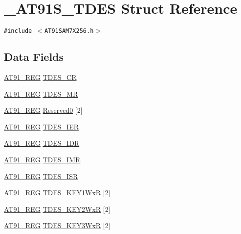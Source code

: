 \hypertarget{struct__AT91S__TDES}{
\section{\_\-AT91S\_\-TDES Struct Reference}
\label{struct__AT91S__TDES}
}
{\tt \#include $<$AT91SAM7X256.h$>$}

\subsection*{Data Fields}
\begin{CompactItemize}
\item 
\hyperlink{AT91SAM7X256_8h_712ad5a1ac1bd02f3e95a7526c283ce1}{AT91\_\-REG} \hyperlink{struct__AT91S__TDES_7b48f8c1a3bf999c41c0081813b4a75b}{TDES\_\-CR}
\item 
\hyperlink{AT91SAM7X256_8h_712ad5a1ac1bd02f3e95a7526c283ce1}{AT91\_\-REG} \hyperlink{struct__AT91S__TDES_8962dd4d8dd09c236b10c035683fe22f}{TDES\_\-MR}
\item 
\hyperlink{AT91SAM7X256_8h_712ad5a1ac1bd02f3e95a7526c283ce1}{AT91\_\-REG} \hyperlink{struct__AT91S__TDES_e2972cb00f78bd3947d036cd464bfcce}{Reserved0} \mbox{[}2\mbox{]}
\item 
\hyperlink{AT91SAM7X256_8h_712ad5a1ac1bd02f3e95a7526c283ce1}{AT91\_\-REG} \hyperlink{struct__AT91S__TDES_22d098ef906e1e524e762a202d5dc27d}{TDES\_\-IER}
\item 
\hyperlink{AT91SAM7X256_8h_712ad5a1ac1bd02f3e95a7526c283ce1}{AT91\_\-REG} \hyperlink{struct__AT91S__TDES_12b83111ccac647664613ab4b4b8281f}{TDES\_\-IDR}
\item 
\hyperlink{AT91SAM7X256_8h_712ad5a1ac1bd02f3e95a7526c283ce1}{AT91\_\-REG} \hyperlink{struct__AT91S__TDES_d4ddcccc04c725741459056df6041e3c}{TDES\_\-IMR}
\item 
\hyperlink{AT91SAM7X256_8h_712ad5a1ac1bd02f3e95a7526c283ce1}{AT91\_\-REG} \hyperlink{struct__AT91S__TDES_3edbcfd3d98eacb37e846486fe2a6625}{TDES\_\-ISR}
\item 
\hyperlink{AT91SAM7X256_8h_712ad5a1ac1bd02f3e95a7526c283ce1}{AT91\_\-REG} \hyperlink{struct__AT91S__TDES_676b746a69e6edc0b99eda688b43b864}{TDES\_\-KEY1WxR} \mbox{[}2\mbox{]}
\item 
\hyperlink{AT91SAM7X256_8h_712ad5a1ac1bd02f3e95a7526c283ce1}{AT91\_\-REG} \hyperlink{struct__AT91S__TDES_1015610e74e256b2f2ecf3b5913b90e0}{TDES\_\-KEY2WxR} \mbox{[}2\mbox{]}
\item 
\hyperlink{AT91SAM7X256_8h_712ad5a1ac1bd02f3e95a7526c283ce1}{AT91\_\-REG} \hyperlink{struct__AT91S__TDES_8b345b66cd8daad1734281344c155b66}{TDES\_\-KEY3WxR} \mbox{[}2\mbox{]}

\end{CompactItemize}
